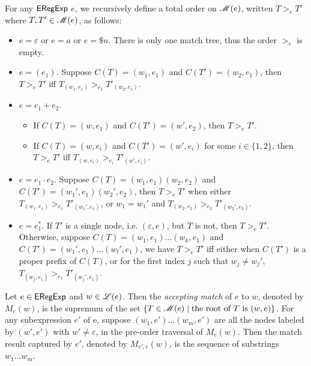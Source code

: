   \begin{definition}
  		
  	For any ${\sf ERegExp}$ $e$, we recursively define a total order on $\mathscr{M}(e)$, written $T
  	>_e T'$ where $T, T' \in \mathscr{M}(e)$, as follows:
  	\begin{itemize}
  		\item $e = \varepsilon$ or $e = a$ or $e = \$ n$. There is only one match tree, thus the
  		order $>_e$ is empty.
  		
  		\item $e = (e_1)$. Suppose $C (T) = (w_1, e_1)$ and $C (T') = (w_2, e_1)$,
  		then $T >_e T'$ iff $T_{(w_1, e_1)} >_{e_1} T'_{(w_2, e_1)}$.
  		
  		\item $e = e_1 + e_2$.
  		\begin{itemize}
  			\item If $C (T) = (w, e_1)$ and $C (T') = (w', e_2)$, then $T >_e T'$.
  			
  			\item If $C (T) = (w, e_i)$ and $C (T') = (w', e_i)$ for some $i \in \{ 1,
  			2 \}$, then $T >_e T'$ iff $T_{(w, e_i)} >_{e_i} T'_{(w', e_i)}$.
  		\end{itemize}
  		\item $e = e_1 \cdot e_2$. Suppose $C (T) = (w_1, e_1) (w_2, e_2)$ and $C (T') =
  		(w_1', e_1) (w_2', e_2)$, then $T >_e T'$ when either $T_{(w_1, e_1)} >_{e_1}
  		T'_{(w_1', e_1)}$, or $w_1 = w_1'$ and $T_{(w_2, e_2)} >_{e_2} T'_{(w_2', e_2)}$.
  		
  		\item $e = e_1^{\ast}$. If $T' $ is  a single node, i.e. $(\varepsilon, e)$, but $T$ is not, then $T >_e T'$.
  		Otherwise, suppose $C(T) = (w_1, e_1) \ldots (w_k, e_1)$ and $C (T') =
  		(w_1', e_1) \ldots (w_l', e_1)$, we have $T >_e T'$ iff either when $C (T')$
  		is a proper prefix of $C (T)$, or for the first index $j$ such that $w_j
  		\neq w_j'$, $T_{(w_j, e_1)} >_{e_1} T'_{(w_j', e_1)}$.
  	\end{itemize}
  	
  	Let $e \in {\sf ERegExp}$ and $w \in \mathscr{L}(e)$. Then the \emph{accepting match} of $e$ to $w$, denoted by $M_e(w)$, is the supremum of the set $\{ T \in \mathscr{M}(e) \mid \mbox{the root of } T \mbox{ is } (w, e) \}$.
%  	
  	For any subexpression $e'$ of e, suppose $(w_1, e') \ldots (w_m, e')$ are
  	all the nodes labeled by $(w', e')$ with $w' \neq \varepsilon$, in the
  	pre-order traversal of $M_e(w)$. Then the match result captured by $e'$, denoted
  	by $M_{e', e} (w)$, is the sequence of substrings $w_1 \ldots w_m$.
  \end{definition}
  
